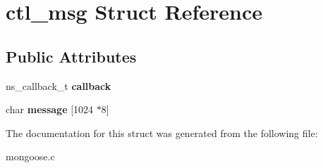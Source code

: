 \hypertarget{structctl__msg}{\section{ctl\-\_\-msg Struct Reference}
\label{structctl__msg}
}
\subsection*{Public Attributes}
\begin{DoxyCompactItemize}
\item 
\hypertarget{structctl__msg_a584176a17c21aff681027e71dc3e8c69}{ns\-\_\-callback\-\_\-t {\bfseries callback}}\label{structctl__msg_a584176a17c21aff681027e71dc3e8c69}

\item 
\hypertarget{structctl__msg_aec0f071897eca5d58f2351740bec9529}{char {\bfseries message} \mbox{[}1024 $\ast$8\mbox{]}}\label{structctl__msg_aec0f071897eca5d58f2351740bec9529}

\end{DoxyCompactItemize}


The documentation for this struct was generated from the following file\-:\begin{DoxyCompactItemize}
\item 
mongoose.\-c\end{DoxyCompactItemize}
